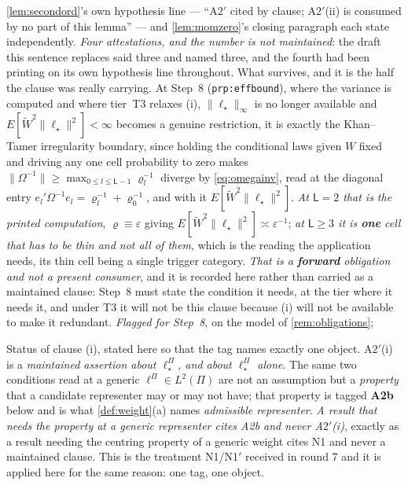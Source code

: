 \begin{enumerate}
\cref{lem:secondord}'s own hypothesis line --- ``A$2'$ cited by clause; A$2'$(ii) is consumed by no
part of this lemma'' --- and \cref{lem:momzero}'s closing paragraph each state independently.
\emph{Four attestations, and the number is not maintained}: the draft this sentence replaces said
three and named three, and the fourth had been printing on its own hypothesis line throughout.
What survives, and it is the half the clause was really carrying. At Step~8
(\texttt{prp:effbound}), where the variance is computed and where tier~T3 relaxes (i), $\|\ell_\star\|_\infty$
is no longer available and $E[\widetilde W^{2}\|\ell_\star\|^{2}]<\infty$ becomes a genuine restriction, 
it is exactly the Khan--Tamer irregularity boundary, since holding the conditional laws given $W$ fixed and
driving any one cell probability to zero makes
$\|\Omega^{-1}\|\ge\max_{0\le l\le\mathsf L-1}\varrho_l^{-1}$ diverge by
\eqref{eq:omegainv}, read at the diagonal entry
$e_l'\Omega^{-1}e_l=\varrho_l^{-1}+\varrho_0^{-1}$, and with it
$E[\widetilde W^{2}\|\ell_\star\|^{2}]$. \emph{At $\mathsf L=2$ that is
the printed computation}, $\varrho\equiv\varepsilon$ giving
$E[\widetilde W^{2}\|\ell_\star\|^{2}]\asymp\varepsilon^{-1}$; \emph{at $\mathsf L\ge3$ it is
\textbf{one} cell that has to be thin and not all of them}, which is the reading the application needs,
its thin cell being a single trigger category.
\emph{That is a \textbf{forward} obligation and not a present consumer}, and it is recorded here rather than
carried as a maintained clause: Step~8 must state the condition it needs, at the tier where it needs it, and
under T3 it will not be this clause because (i) will not be available to make it redundant. \emph{Flagged
for Step~8}, on the model of \cref{rem:obligations};
\end{enumerate}

\medskip
\noindent
 Status of clause \textup{(i)}, stated here so that the tag names exactly one object. A$2'$(i) is a
\emph{maintained assertion about $\ell^\Pi_\star$, and about $\ell^\Pi_\star$ alone}. The same two
conditions read at a generic $\ell^\Pi\in L^{2}(\Pi)$ are not an assumption but a \emph{property} that a
candidate representer may or may not have; that property is tagged \textbf{A2b} below and is what
\cref{def:weight}(a) names \emph{admissible representer}. \emph{A result that needs the property at a
generic representer cites A2b and never A$2'$(i)}, exactly as a result needing the centring
property of a generic weight cites N1 and never a maintained clause. This is the
treatment N1/N1$'$ received in round 7 and it is applied here for the same reason: one tag, one object.

